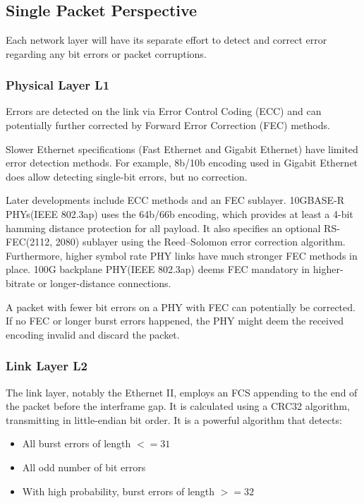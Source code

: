 \documentclass[12pt]{article}
\begin{document}
\section{}

\subsection{Single Packet Perspective}

Each network layer will have its separate effort to detect and correct error regarding any bit errors or packet corruptions.

\subsubsection{Physical Layer L1}

Errors are detected on the link via Error Control Coding (ECC) and can potentially further corrected by Forward Error Correction (FEC) methods. 

Slower Ethernet specifications (Fast Ethernet and Gigabit Ethernet) have limited error detection methods. For example, 8b/10b encoding used in Gigabit Ethernet does allow detecting single-bit errors, but no correction.

Later developments include ECC methods and an FEC sublayer. 10GBASE-R PHYs(IEEE 802.3ap) uses the 64b/66b encoding, which provides at least a 4-bit hamming distance protection for all payload. It also specifies an optional RS-FEC(2112, 2080) sublayer using the Reed–Solomon error correction algorithm. Furthermore, higher symbol rate PHY links have much stronger FEC methods in place. 100G backplane PHY(IEEE 802.3ap) deems FEC mandatory in higher-bitrate or longer-distance connections.

A packet with fewer bit errors on a PHY with FEC can potentially be corrected. If no FEC or longer burst errors happened, the PHY might deem the received encoding invalid and discard the packet.

\subsubsection{Link Layer L2}

The link layer, notably the Ethernet II, employs an FCS appending to the end of the packet before the interframe gap. It is calculated using a CRC32 algorithm, transmitting in little-endian bit order. It is a powerful algorithm that detects:
\begin{itemize}
    \item All burst errors of length $<= 31$
    \item All odd number of bit errors
    \item With high probability, burst errors of length $>= 32$
\end{itemize}
\end{document}
